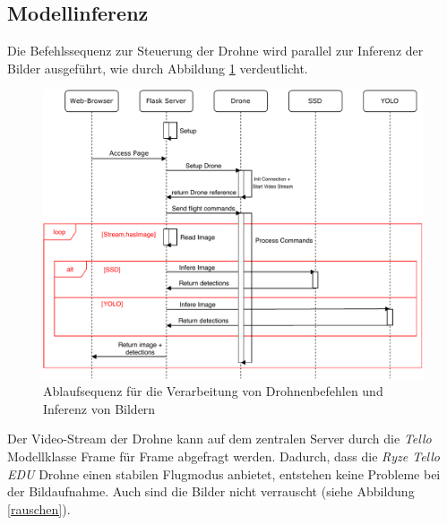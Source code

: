 \subsection*{Modellinferenz}

Die Befehlssequenz zur Steuerung der Drohne wird parallel zur Inferenz der Bilder ausgeführt, wie durch Abbildung \ref{sequence_diagram} verdeutlicht.

\begin{figure}[H]
	\begin{center}
		\includegraphics[width=15cm]{Bilder/sequence_diagram.pdf}
		\caption[Ablaufsequenz für die Verarbeitung von Drohnenbefehlen und Inferenz von Bildern]{Ablaufsequenz für die Verarbeitung von Drohnenbefehlen und Inferenz von Bildern}
		\label{sequence_diagram}
	\end{center}
\end{figure}

Der Video-Stream der Drohne kann auf dem zentralen Server durch die \textit{Tello} Modellklasse Frame für Frame abgefragt werden. Dadurch, dass die \textit{Ryze Tello EDU} Drohne einen stabilen Flugmodus anbietet, entstehen keine Probleme bei der Bildaufnahme. Auch sind die Bilder nicht verrauscht (siehe Abbildung \ref{rauschen}).

